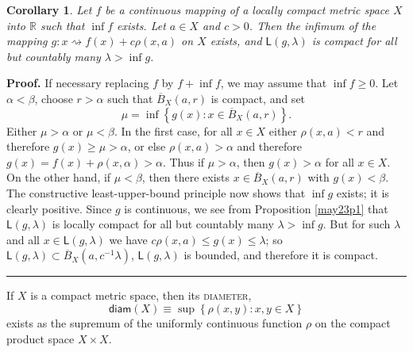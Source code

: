 \documentclass[11pt]{article}%
\newtheorem{corollary}[theorem]{Corollary}
\newenvironment{proof}[1][Proof]{\noindent\textbf{#1.} }{\ \rule{0.5em}{0.5em}}
\begin{document}
\begin{corollary}
\label{may25c3}Let $f$ be a continuous mapping of a locally compact metric
space $X$ into $\mathbb{R}$ such that $\inf f$ exists. Let $a\in X$ and $c>0$.
Then the infimum of the mapping $g:x\rightsquigarrow f(x)+c\rho(x,a)$ on $X$
exists, and $\mathsf{L}(g,\lambda)$ is compact for all but countably many
$\lambda>\inf g$.
\end{corollary}

\begin{proof}
If necessary replacing $f$ by $f+\inf f$, we may assume that $\inf
f\geqslant0$. Let $\alpha<\beta$, choose $r>\alpha$ such that $\overline
{B}_{X}(a,r)$ is compact, and set%
\[
\mu=\inf\left\{  g(x):x\in\overline{B}_{X}(a,r)\right\}  .
\]
Either $\mu>\alpha$ or $\mu<\beta$. In the first case, for all $x\in X$ either
$\rho(x,a)<r$ and therefore $g(x)\geqslant\mu>\alpha$, or else $\rho
(x,a)>\alpha$ and therefore $g(x)=f(x)+\rho(x,\alpha)>\alpha$. Thus if
$\mu>\alpha$, then $g(x)>\alpha$ for all $x\in X$. On the other hand, if
$\mu<\beta$, then there exists $x\in\overline{B}_{X}(a,r)$ with $g(x)<\beta$.
The constructive least-upper-bound principle \cite[Thm. 2.1.18]{bv} now shows
that $\inf g$ exists; it is clearly positive. Since $g$ is continuous, we see
from Proposition \ref{may23p1} that $\mathsf{L}(g,\lambda)$ is locally compact
for all but countably many $\lambda>\inf g$. But for such $\lambda$ and all
$x\in\mathsf{L}(g,\lambda)$ we have $c\rho(x,a)\leqslant g(x)\leqslant\lambda
$; so $\mathsf{L}(g,\lambda)\subset\overline{B}_{X}(a,c^{-1}\lambda)$,
$\mathsf{L}(g,\lambda)$ is bounded, and therefore it is compact.
\end{proof}

%

\medskip


If $X$ is a compact metric space, then its \textsc{diameter},%
\[
\mathsf{diam}(X)\equiv\sup\left\{  \rho(x,y):x,y\in X\right\}
\]
exists as the supremum of the uniformly continuous function $\rho$ on the
compact product space $X\times X$.
\end{document}
